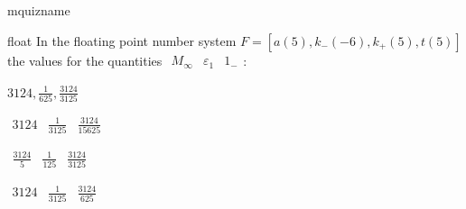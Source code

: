 \documentclass[12pt]{article}
\begin{document}
\begin{quiz}{mquizname}


\begin{multi}{float}
In the floating point number system $  F=\left[ a(5), k_{-}(-6), k_{+}(5), t(5) \right]  $ the values for the quantities 
$ {\begin{array}{ccc}M_{\infty}& \varepsilon_{1}& 1_{-}\end{array}} $:
\item* $ 3124, \frac{1}{625}, \frac{3124}{3125} $
\item  $ {\begin{array}{ccc}3124& \frac{1}{3125}& \frac{3124}{15625}\end{array}} $
\item  $ {\begin{array}{ccc}\frac{3124}{5}& \frac{1}{125}& \frac{3124}{3125}\end{array}} $
\item  $ {\begin{array}{ccc}3124& \frac{1}{3125}& \frac{3124}{625}\end{array}} $
\end{multi}

\end{quiz}
\end{document}
